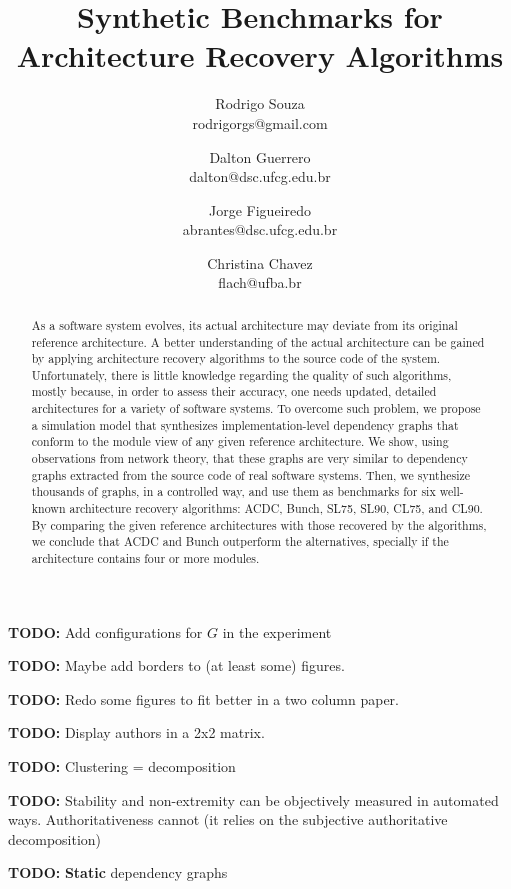 \documentclass[11pt,twocolumn,a4paper,english]{article}
\title{
Synthetic Benchmarks for Architecture Recovery Algorithms}
\author{Rodrigo Souza \\ rodrigorgs@gmail.com 
\and Dalton Guerrero \\ dalton@dsc.ufcg.edu.br
\and Jorge Figueiredo \\ abrantes@dsc.ufcg.edu.br
\and Christina Chavez \\ flach@ufba.br
}
\newcommand{\TODO}{\textbf{TODO:} }
\begin{document}
\sloppy
\maketitle

\tableofcontents
\vspace{1 em}

\TODO Add configurations for $G$ in the experiment

\TODO Maybe add borders to (at least some) figures.

\TODO Redo some figures to fit better in a two column paper.

\TODO Display authors in a 2x2 matrix.

\TODO Clustering = decomposition

\TODO Stability and non-extremity can be objectively measured in automated ways. Authoritativeness cannot (it relies on the subjective authoritative decomposition)

\TODO \textbf{Static} dependency graphs



\begin{abstract}
	As a software system evolves, its actual architecture may deviate from its original reference architecture. A better understanding of the actual architecture can be gained by applying architecture recovery algorithms to the source code of the system. Unfortunately, there is little knowledge regarding the quality of such algorithms, mostly because, in order to assess their accuracy, one needs updated, detailed architectures for a variety of software systems.
	To overcome such problem, we propose a simulation model that synthesizes implementation-level dependency graphs that conform to the module view of any given reference architecture. We show, using observations from network theory, that these graphs are very similar to dependency graphs extracted from the source code of real software systems. 
	Then, we synthesize thousands of graphs, in a controlled way, and use them as benchmarks for six well-known architecture recovery algorithms: ACDC, Bunch, SL75, SL90, CL75, and CL90. By comparing the given reference architectures with those recovered by the algorithms, we conclude that ACDC and Bunch outperform the alternatives, specially if the architecture contains four or more modules.\end{abstract}
\end{document}
